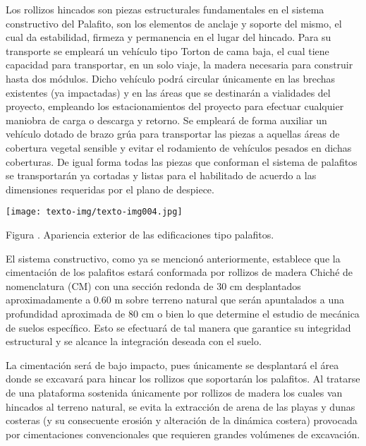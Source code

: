\documentclass{article}
\newcounter{Figura}
\renewcommand\theFigura{\arabic{Figura}}
\begin{document}
Los rollizos hincados son piezas estructurales fundamentales en el sistema constructivo del Palafito, son los elementos de anclaje y soporte del mismo, el cual da estabilidad, firmeza y permanencia en el lugar del hincado. Para su transporte se empleará un vehículo tipo Torton de cama baja, el cual tiene capacidad para transportar, en un solo viaje, la madera necesaria para construir hasta dos módulos. Dicho vehículo podrá circular únicamente en las brechas existentes (ya impactadas) y en las áreas que se destinarán a vialidades del proyecto, empleando los estacionamientos del proyecto para efectuar cualquier maniobra de carga o descarga y retorno. Se empleará de forma auxiliar un vehículo dotado de brazo grúa para transportar las piezas a aquellas áreas de cobertura vegetal sensible y evitar el rodamiento de vehículos pesados en dichas coberturas. De igual forma todas las piezas que conforman el sistema de palafitos se transportarán ya cortadas y listas para el habilitado de acuerdo a las dimensiones requeridas por el plano de despiece.


\bigskip

 \texttt{[image: texto-img/texto-img004.jpg]} 


\bigskip

Figura \stepcounter{Figura}{\theFigura}. Apariencia exterior de las edificaciones tipo palafitos.


\bigskip


\bigskip

El sistema constructivo, como ya se mencionó anteriormente, establece que la cimentación de los palafitos estará conformada por rollizos de madera Chiché de nomenclatura (CM) con una sección redonda de 30 cm desplantados aproximadamente a 0.60 m sobre terreno natural que serán apuntalados a una profundidad aproximada de 80 cm o bien lo que determine el estudio de mecánica de suelos específico. Esto se efectuará de tal manera que garantice su integridad estructural y se alcance la integración deseada con el suelo.


\bigskip

La cimentación será de bajo impacto, pues únicamente se desplantará el área donde se excavará para hincar los rollizos que soportarán los palafitos. Al tratarse de una plataforma sostenida únicamente por rollizos de madera los cuales van hincados al terreno natural, se evita la extracción de arena de las playas y dunas costeras (y su consecuente erosión y alteración de la dinámica costera) provocada por cimentaciones convencionales que requieren grandes volúmenes de excavación. 
\end{document}

